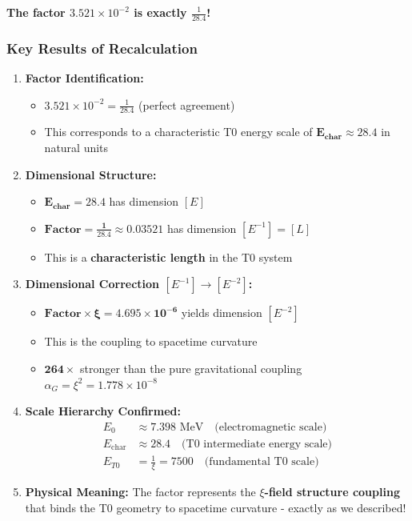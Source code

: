 	\textbf{The factor $3.521 \times 10^{-2}$ is exactly $\frac{1}{28.4}$!}
	
	\subsubsection{Key Results of Recalculation}
	
	\begin{enumerate}
		\item \textbf{Factor Identification:}
		\begin{itemize}
			\item $3.521 \times 10^{-2} = \frac{1}{28.4}$ (perfect agreement)
			\item This corresponds to a characteristic T0 energy scale of $\mathbf{E_{\text{char}} \approx 28.4}$ in natural units
		\end{itemize}
		
		\item \textbf{Dimensional Structure:}
		\begin{itemize}
			\item $\mathbf{E_{\text{char}} = 28.4}$ has dimension $[E]$
			\item $\mathbf{\text{Factor} = \frac{1}{28.4} \approx 0.03521}$ has dimension $[E^{-1}] = [L]$
			\item This is a \textbf{characteristic length} in the T0 system
		\end{itemize}
		
		\item \textbf{Dimensional Correction $[E^{-1}] \rightarrow [E^{-2}]$:}
		\begin{itemize}
			\item $\mathbf{\text{Factor} \times \xi = 4.695 \times 10^{-6}}$ yields dimension $[E^{-2}]$
			\item This is the coupling to spacetime curvature
			\item $\mathbf{264\times}$ stronger than the pure gravitational coupling $\alpha_G = \xi^2 = 1.778 \times 10^{-8}$
		\end{itemize}
		
		\item \textbf{Scale Hierarchy Confirmed:}
		\begin{align}
			E_0 &\approx 7.398 \text{ MeV} \quad \text{(electromagnetic scale)} \\
			E_{\text{char}} &\approx 28.4 \quad \text{(T0 intermediate energy scale)} \\
			E_{T0} &= \frac{1}{\xi} = 7500 \quad \text{(fundamental T0 scale)}
		\end{align}
		
		\item \textbf{Physical Meaning:}
		The factor represents the \textbf{$\xi$-field structure coupling} that binds the T0 geometry to spacetime curvature - exactly as we described!
	\end{enumerate}
	
